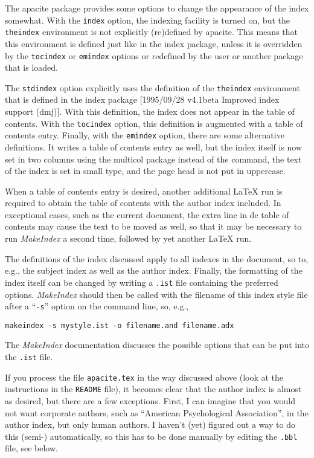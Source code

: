 \documentclass{article}
\newcommand{\MakeIndex}{\textit{MakeIndex}}
\newcommand{\pkg}[1]{\textsf{#1}}%
\newcommand{\fname}[1]{\texttt{#1}}%
\newcommand{\pkgoption}[1]{\texttt{#1}}%
\newcommand{\cmd}[1]{\texttt{\string#1}}%
\begin{document}
The \pkg{apacite} package provides some options to change the appearance of
the index somewhat. With the \pkgoption{index} option, the indexing facility
is turned on, but the \cmd{theindex} environment is not explicitly (re)defined
by \pkg{apacite}. This means that this environment is defined just like in the
\pkg{index} package, unless it is overridden by the \pkgoption{tocindex} or
\pkgoption{emindex} options or redefined by the user or another package that
is loaded.

The \pkgoption{stdindex} option explicitly uses the definition of the
\cmd{theindex} environment that is defined in the \pkg{index} package
[1995/09/28 v4.1beta Improved index support (dmj)].
With this definition, the index does not appear in the table of contents. With
the \pkgoption{tocindex} option, this definition is augmented with a table of
contents entry. Finally, with the \pkgoption{emindex} option, there are some
alternative definitions. It writes a table of contents entry as well, but the
index itself is now set in two columns using the \pkg{multicol} package
instead of the \cmd{\twocolumn} command, the text of the index is set in small
type, and the page head is not put in uppercase.

When a table of contents entry is desired, another additional \LaTeX{} run is
required to obtain the table of contents with the author index included. In
exceptional cases, such as the current document, the extra line in de table of
contents may cause the text to be moved as well, so that it may be necessary
to run \MakeIndex{} a second time, followed by yet another \LaTeX{} run.

The definitions of the index discussed apply to all indexes in the document,
so to, e.g., the subject index as well as the author index. Finally, the
formatting of the index itself can be changed by writing a \fname{.ist} file
containing the preferred options. \MakeIndex{} should then be called with the
filename of this index style file after a ``\verb+-s+'' option on the command
line, so, e.g.,
\begin{verbatim}
makeindex -s mystyle.ist -o filename.and filename.adx
\end{verbatim}
The \MakeIndex{} documentation discusses the possible options that can be put
into the \fname{.ist} file.

If you process the file \fname{apacite.tex} in the way discussed above (look
at the instructions in the \fname{README} file), it becomes clear that the
author index is almost as desired, but there are a few exceptions. First, I
can imagine that you would not want corporate authors, such as ``American
Psychological Association'', in the author index, but only human authors. I
haven't (yet) figured out a way to do this (semi-) automatically, so this has
to be done manually by editing the \fname{.bbl} file, see below.
\end{document}
